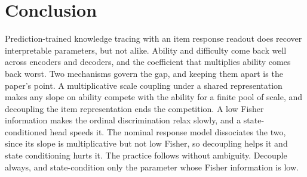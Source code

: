 \documentclass[sigconf,nonacm,screen]{acmart}
\begin{document}
\section{Conclusion}
Prediction-trained knowledge tracing with an item response readout does recover
interpretable parameters, but not alike. Ability and difficulty come back well
across encoders and decoders, and the coefficient that multiplies ability comes back
worst. Two mechanisms govern the gap, and keeping them apart is the paper's point. A
multiplicative scale coupling under a shared representation makes any slope on
ability compete with the ability for a finite pool of scale, and decoupling the item
representation ends the competition. A low Fisher information makes the ordinal
discrimination relax slowly, and a state-conditioned head speeds it. The nominal
response model dissociates the two, since its slope is multiplicative but not low
Fisher, so decoupling helps it and state conditioning hurts it. The practice follows
without ambiguity. Decouple always, and state-condition only the parameter whose
Fisher information is low.



\end{document}
